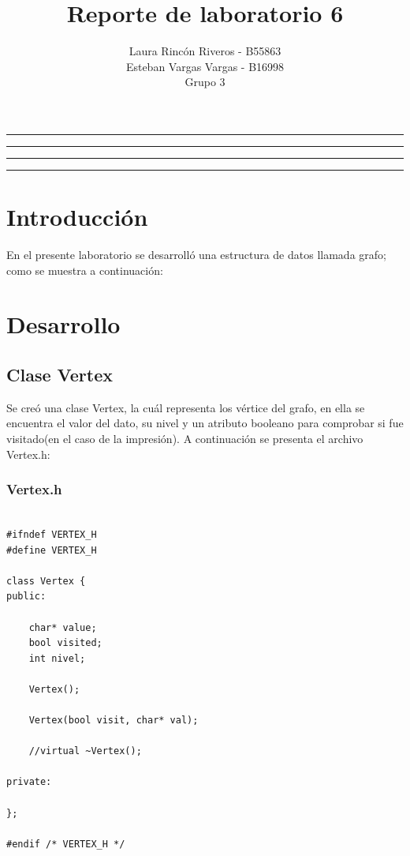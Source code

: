 \documentclass[11pt]{article}
\title{Reporte de laboratorio 6}
\author{Laura Rincón Riveros - B55863\\Esteban Vargas Vargas - B16998\\ Grupo 3}
\begin{document}
\maketitle
\hrule
\hrule
\tableofcontents
\hspace{5mm}
\hrule
\hrule

\section{Introducción}

En el presente laboratorio se desarrolló una estructura de datos llamada grafo; como se muestra a continuación:


\newpage
\section{Desarrollo}

\subsection{Clase Vertex}

Se creó una clase Vertex, la cuál representa los vértice del grafo, en ella se encuentra el valor del dato, su nivel y un atributo booleano para comprobar si fue visitado(en el caso de la impresión). A continuación se presenta el archivo Vertex.h: 

\subsubsection{Vertex.h}
\lstset {language=C}
\begin{lstlisting}

#ifndef VERTEX_H
#define VERTEX_H

class Vertex {
public:

    char* value;
    bool visited;
    int nivel;

    Vertex();

    Vertex(bool visit, char* val);

    //virtual ~Vertex();

private:

};

#endif /* VERTEX_H */




\end{lstlisting}
\newpage
\end{document}
